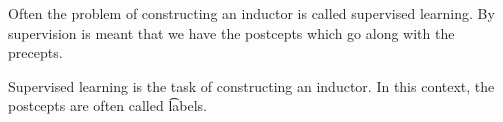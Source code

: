 
\sbasic


















\sstart
{}


Often the problem of constructing an inductor is called supervised learning.
By supervision is meant that we have the postcepts which go along with the precepts.


Supervised learning is the task of constructing an inductor.
In this context, the postcepts are often called \t{labels}.
\strats

